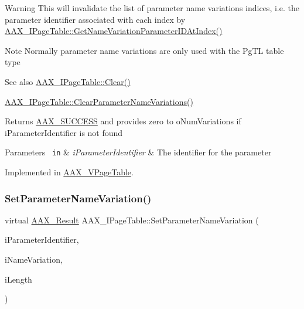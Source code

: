\begin{DoxyWarning}{Warning}
This will invalidate the list of parameter name variations indices, i.\+e. the parameter identifier associated with each index by \mbox{\hyperlink{a01849_ac505024dd195c1965c54acac8f1f3016}{A\+A\+X\+\_\+\+I\+Page\+Table\+::\+Get\+Name\+Variation\+Parameter\+I\+D\+At\+Index()}}
\end{DoxyWarning}
\begin{DoxyNote}{Note}
Normally parameter name variations are only used with the {\ttfamily \textquotesingle{}Pg\+TL\textquotesingle{}} table type
\end{DoxyNote}
\begin{DoxySeeAlso}{See also}
\mbox{\hyperlink{a01849_a00a902ce17c43ae32947dba6088936d2}{A\+A\+X\+\_\+\+I\+Page\+Table\+::\+Clear()}} 

\mbox{\hyperlink{a01849_a6af3965eaf2baeadef9a44aa9c77ecbb}{A\+A\+X\+\_\+\+I\+Page\+Table\+::\+Clear\+Parameter\+Name\+Variations()}}
\end{DoxySeeAlso}
\begin{DoxyReturn}{Returns}
\mbox{\hyperlink{a00494_a5f8c7439f3a706c4f8315a9609811937aeddbd1bb67e3a66e6af54a4b4a7a57b3}{A\+A\+X\+\_\+\+S\+U\+C\+C\+E\+SS}} and provides zero to {\ttfamily o\+Num\+Variations} if {\ttfamily i\+Parameter\+Identifier} is not found
\end{DoxyReturn}

\begin{DoxyParams}[1]{Parameters}
\mbox{\texttt{ in}}  & {\em i\+Parameter\+Identifier} & The identifier for the parameter \\
\hline
\end{DoxyParams}


Implemented in \mbox{\hyperlink{a01929_a7d1ab121f175fffa26f72e008031ca53}{A\+A\+X\+\_\+\+V\+Page\+Table}}.

\mbox{\label{a01849_a28643218ca7286f45c4820a020a06bf8}} 
\subsubsection{\texorpdfstring{SetParameterNameVariation()}{SetParameterNameVariation()}}
{\footnotesize\ttfamily virtual \mbox{\hyperlink{a00392_a4d8f69a697df7f70c3a8e9b8ee130d2f}{A\+A\+X\+\_\+\+Result}} A\+A\+X\+\_\+\+I\+Page\+Table\+::\+Set\+Parameter\+Name\+Variation (\begin{DoxyParamCaption}\item[{\mbox{\hyperlink{a00392_ab4e01b971dac1b25632fd9f710dd8f77}{A\+A\+X\+\_\+\+C\+Page\+Table\+Param\+ID}}}]{i\+Parameter\+Identifier,  }\item[{const \mbox{\hyperlink{a01873}{A\+A\+X\+\_\+\+I\+String}} \&}]{i\+Name\+Variation,  }\item[{int32\+\_\+t}]{i\+Length }\end{DoxyParamCaption})\hspace{0.3cm}{\ttfamily [pure virtual]}}

